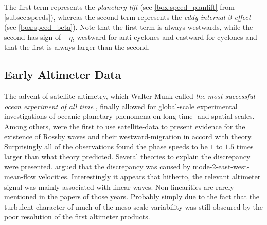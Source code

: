 The first term represents the \textit{planetary lift} (see \cref{box:speed_planlift} from \cref{subsec:speeds}), whereas the second term represents the \textit{eddy-internal $\beta$-effect} (see \cref{box:speed_beta}). Note that the first term is always westwards, while the second has sign of $-\eta$, \ie westward for anti-cyclones and eastward for cyclones and that the first is always larger than the second.

\subsection{Early Altimeter Data}\label{sec:hist_killworth}
The advent of satellite altimetry, which Walter Munk called \textit{the most successful ocean experiment of all time} \citet{Munk2002}, finally allowed for
global-scale experimental investigations of oceanic planetary phenomena on long time- and spatial scales. Among others,
\citet{matano1993seasonal,cipollini1997concurrent,le1993sea} were the first to use satellite-data to present evidence for the existence of Rossby waves and their
westward-migration in accord with theory. Surprisingly all of the observations found the phase speeds to be $1$ to $1.5$ times larger than what theory
predicted. Several theories to explain the discrepancy were presented. \Eg \citet{Killworth1997a} argued that the discrepancy was caused by
mode-2-east-west-mean-flow velocities. Interestingly it appears that hitherto, the relevant altimeter signal was mainly associated with linear waves.
Non-linearities are rarely mentioned in the papers of those years. Probably simply due to the fact that the turbulent character of much of the
meso-scale variability was still obscured by the poor resolution of the first altimeter products.

